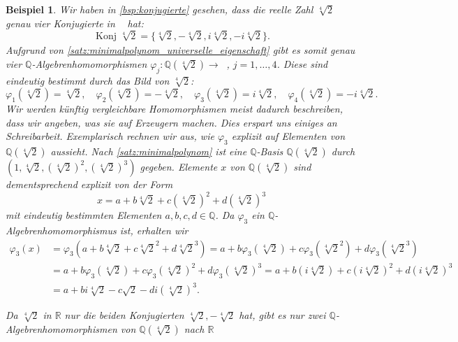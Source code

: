 \documentclass[a4paper, twoside, 11pt, ngerman]{report}
\newcommand{\QQ}{\mathds Q}
\newcommand{\RR}{\mathds R}
\DeclareMathOperator{\alg}{alg}
\DeclareMathOperator{\Konj}{Konj}
\DeclareMathOperator{\QQalg}{\QQ^{\alg}}
\theoremstyle{definistyle}
\newtheorem{bsp}[satz]{Beispiel}
\theoremstyle{remark}
\begin{document}
\begin{bsp}\label{bsp:ue-minpol}
Wir haben in \ref{bsp:konjugierte} gesehen, dass die reelle Zahl $\sqrt[4]{2}$
genau vier Konjugierte in $\QQalg$ hat:
\[
\Konj_{\QQalg}\sqrt[4]{2}=\{\sqrt[4]{2},-\sqrt[4]{2},i\sqrt[4]{2},-i\sqrt[4]{2}\}.
\]
Aufgrund von \ref{satz:minimalpolynom_universelle_eigenschaft} gibt es somit genau vier
$\QQ$-Algebrenhomomorphismen $\varphi_j\colon\QQ(\sqrt[4]{2})\to\QQalg$, $j=1,\ldots,4$. Diese sind eindeutig bestimmt durch das Bild von $\sqrt[4]{2}$:
\[
\varphi_1(\sqrt[4]{2})=\sqrt[4]{2}, \quad \varphi_2(\sqrt[4]{2})=-\sqrt[4]{2},\quad \varphi_3(\sqrt[4]{2})=i\sqrt[4]{2}, \quad\varphi_4(\sqrt[4]{2})=-i\sqrt[4]{2}.
\]
Wir werden künftig vergleichbare Homomorphismen meist dadurch beschreiben, dass wir angeben,
was sie auf Erzeugern machen. Dies erspart uns einiges an Schreibarbeit.
Exemplarisch rechnen wir aus, wie $\varphi_3$ explizit auf Elementen von $\QQ(\sqrt[4]{2})$ 
aussieht. Nach \ref{satz:minimalpolynom} ist eine $\QQ$-Basis $\QQ(\sqrt[4]{2})$ durch
$(1,\sqrt[4]{2},(\sqrt[4]{2})^2,(\sqrt[4]{2})^3)$ gegeben. Elemente $x$ von $\QQ(\sqrt[4]{2})$
sind dementsprechend explizit von der Form
\[
x=a+b\sqrt[4]{2}+c(\sqrt[4]{2})^2+d(\sqrt[4]{2})^3
\]
mit eindeutig bestimmten Elementen $a,b,c,d\in\QQ$. Da $\varphi_3$ ein $\QQ$-Algebrenhomomorphismus ist, erhalten wir
\begin{align*}
\varphi_3(x)&=\varphi_3(a+b\sqrt[4]{2}+c\sqrt[4]{2}^2+d\sqrt[4]{2}^3)
= a+b\varphi_3(\sqrt[4]{2})+c\varphi_3(\sqrt[4]{2}^2)+d\varphi_3(\sqrt[4]{2}^3) \\
&= a+b\varphi_3(\sqrt[4]{2})+c\varphi_3(\sqrt[4]{2})^2+d\varphi_3(\sqrt[4]{2})^3
=a+b(i\sqrt[4]{2})+c(i\sqrt[4]{2})^2+d(i\sqrt[4]{2})^3 \\
&=a+bi\sqrt[4]{2}-c\sqrt{2}-di(\sqrt[4]{2})^3.
\end{align*}


Da $\sqrt[4]{2}$ in $\RR$ nur die beiden Konjugierten $\sqrt[4]{2},-\sqrt[4]{2}$ hat, gibt es nur zwei $\QQ$-Algebrenhomomorphismen von $\QQ(\sqrt[4]{2})$ nach $\RR$
\end{bsp}
\end{document}
